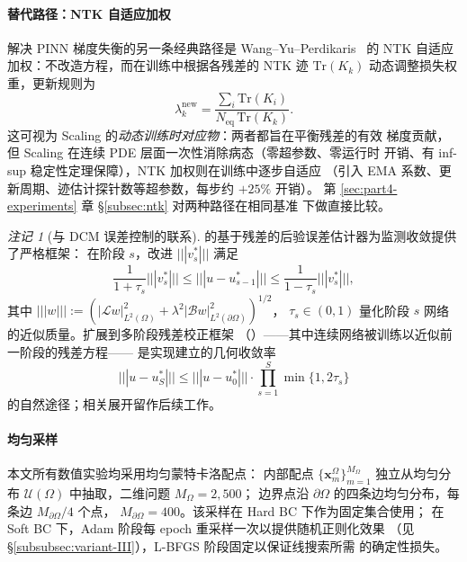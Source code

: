 \documentclass{xmu}
\theoremstyle{plain}
\theoremstyle{remark}
\newtheorem{remark}[theorem]{注记}
\begin{document}
\paragraph{替代路径：NTK 自适应加权}
解决 PINN 梯度失衡的另一条经典路径是 Wang--Yu--Perdikaris~\cite{29}
的 NTK 自适应加权：不改造方程，而在训练中根据各残差的 NTK 迹
$\mathrm{Tr}(K_k)$ 动态调整损失权重，更新规则为
\begin{equation}
\lambda_k^{\mathrm{new}}
= \frac{\sum_i\mathrm{Tr}(K_i)}{N_{\mathrm{eq}}\,\mathrm{Tr}(K_k)}.
\label{eq:ntk-rule}
\end{equation}
这可视为 Scaling 的\emph{动态训练时对应物}：两者都旨在平衡残差的有效
梯度贡献，但 Scaling 在连续 PDE 层面一次性消除病态（零超参数、零运行时
开销、有 inf-sup 稳定性定理保障），NTK 加权则在训练中逐步自适应
（引入 EMA 系数、更新周期、迹估计探针数等超参数，每步约 $+25\%$ 开销）。
第 \ref{sec:part4-experiments} 章 §\ref{subsec:ntk} 对两种路径在相同基准
下做直接比较。

\begin{remark}[与 DCM 误差控制的联系]
\cite{5}的基于残差的后验误差估计器为监测收敛提供了严格框架：%
在阶段 $s$，改进 $|||v_s^*|||$ 满足
\begin{equation}
\frac{1}{1+\tau_s}|||v_s^*||| \le |||u-u_{s-1}^*||| \le \frac{1}{1-\tau_s}|||v_s^*|||,
\end{equation}
其中 $|||w|||:=(|\mathcal L w|_{L^2(\Omega)}^2+\lambda^2|\mathcal B w|_{L^2(\partial\Omega)}^2)^{1/2}$，
$\tau_s\in(0,1)$ 量化阶段 $s$ 网络的近似质量。扩展到多阶段残差校正框架
（\cite[算法 2.1]{5}）——其中连续网络被训练以近似前一阶段的残差方程——
是实现\cite[命题 3.4]{5}建立的几何收敛率
\begin{equation}
|||u-u_S^*||| \le |||u-u_0^*|||\cdot\prod_{s=1}^{S}\min\{1,2\tau_s\}
\end{equation}
的自然途径；相关展开留作后续工作。
\end{remark}


 
\label{subsec:collocation}
 
\paragraph{均匀采样}
本文所有数值实验均采用均匀蒙特卡洛配点\cite{21}：
内部配点 $\{\mathbf{x}_m^\Omega\}_{m=1}^{M_\Omega}$ 独立从均匀分布
$\mathcal U(\Omega)$ 中抽取，二维问题 $M_\Omega = 2{,}500$；
边界点沿 $\partial\Omega$ 的四条边均匀分布，每条边 $M_{\partial\Omega}/4$ 个点，
$M_{\partial\Omega} = 400$。该采样在 Hard BC 下作为固定集合使用；
在 Soft BC 下，Adam 阶段每 epoch 重采样一次以提供随机正则化效果
（见 §\ref{subsubsec:variant-III}），L-BFGS 阶段固定以保证线搜索所需
的确定性损失。
 
\end{document}

